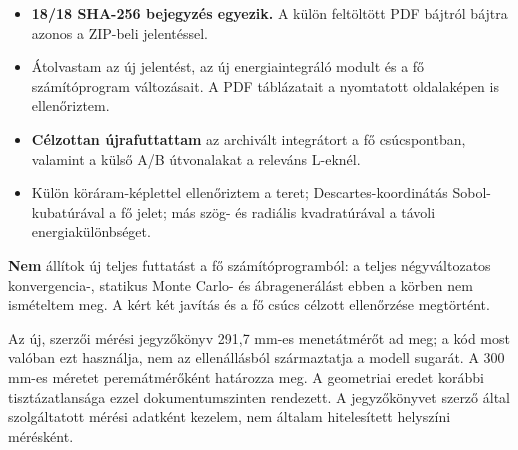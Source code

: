 \documentclass[10pt,a4paper]{article}
\begin{document}
{\par
\begin{itemize}\setlength{\itemsep}{0.5pt}\setlength{\parskip}{0pt}\setlength{\topsep}{1pt}
\item \textbf{18/18 SHA-256 bejegyzés egyezik.} A külön feltöltött PDF bájtról bájtra azonos a ZIP-beli jelentéssel.
\item Átolvastam az új jelentést, az új energiaintegráló modult és a fő számítóprogram változásait. A PDF táblázatait a nyomtatott oldalaképen is ellenőriztem.
\item \textbf{Célzottan újrafuttattam} az archivált integrátort a fő csúcspontban, valamint a külső A/B útvonalakat a releváns L-eknél.
\item Külön köráram-képlettel ellenőriztem a teret; Descartes-koordinátás Sobol-kubatúrával a fő jelet; más szög- és radiális kvadratúrával a távoli energiakülönbséget.
\end{itemize}
\par
\textbf{Nem} állítok új teljes futtatást a fő számítóprogramból: a teljes négyváltozatos konvergencia-, statikus Monte Carlo- és ábragenerálást ebben a körben nem ismételtem meg. A kért két javítás és a fő csúcs célzott ellenőrzése megtörtént.
\par
\par
\vspace{2pt}\par\vspace{0.5pt}
\par
Az új, szerzői mérési jegyzőkönyv 291,7 mm-es menetátmérőt ad meg; a kód most valóban ezt használja, nem az ellenállásból származtatja a modell sugarát. A 300 mm-es méretet peremátmérőként határozza meg. A geometriai eredet korábbi tisztázatlansága ezzel dokumentumszinten rendezett. A jegyzőkönyvet szerző által szolgáltatott mérési adatként kezelem, nem általam hitelesített helyszíni mérésként.
\par
\begin{center}
\end{center}}
\end{document}
